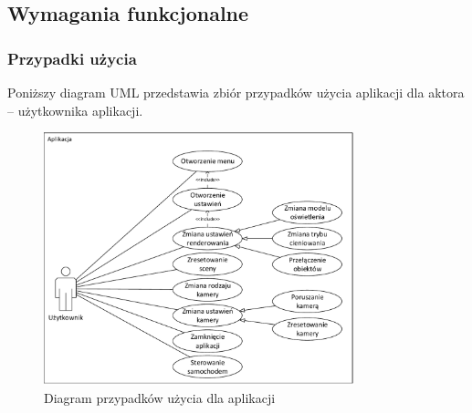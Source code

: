 \documentclass[10pt,a4paper]{article}
\begin{document}
\newpage
\subsection{Wymagania funkcjonalne}

\subsubsection{Przypadki użycia}
Poniższy diagram UML przedstawia zbiór przypadków użycia aplikacji dla aktora -- użytkownika aplikacji.
\begin{figure}[H]
	\centering
	\includegraphics[width=9cm]{Resources/PDF/use-cases.pdf}
	\caption{Diagram przypadków użycia dla aplikacji}
\end{figure}
\end{document}
